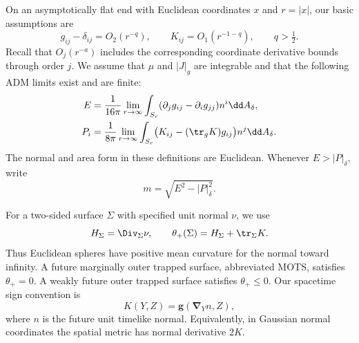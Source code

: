 On an asymptotically flat end with Euclidean coordinates \(x\) and
\(r=|x|\), our basic assumptions are
\begin{equation}\label{n3:intro:decay}
 g_{ij}-\delta_{ij}=O_2(r^{-q}),\qquad
 K_{ij}=O_1(r^{-1-q}),\qquad q>\tfrac12.
\end{equation}
Recall that \(O_j(r^{-a})\) includes the corresponding coordinate
derivative bounds through order \(j\). We assume that \(\mu\) and
\(|J|_g\) are integrable and that the following ADM limits exist and are
finite:
\begin{align}
 E&=\frac1{16\pi}\lim_{r\to\infty}
   \int_{S_r}(\partial_jg_{ij}-\partial_i g_{jj})n^i
                    \dd A_\delta,\label{n3:intro:energy}\\
 P_i&=\frac1{8\pi}\lim_{r\to\infty}
   \int_{S_r}\bigl(K_{ij}-(\tr_gK)g_{ij}\bigr)n^j
                    \dd A_\delta.\label{n3:intro:momentum}
\end{align}
The normal and area form in these definitions are Euclidean. Whenever
\(E>|P|_\delta\), write
\begin{equation}\label{n3:intro:rest-mass}
                         m=\sqrt{E^2-|P|_\delta^2}.
\end{equation}

For a two-sided surface \(\Sigma\) with specified unit normal \(\nu\),
we use
\[
 H_\Sigma=\Div_\Sigma\nu,\qquad
 \theta_+(\Sigma)=H_\Sigma+\tr_\Sigma K.
\]
Thus Euclidean spheres have positive mean curvature for the normal
toward infinity. A future marginally outer trapped surface, abbreviated
MOTS, satisfies \(\theta_+=0\). A weakly future outer trapped surface
satisfies \(\theta_+\le0\). Our spacetime sign convention is
\begin{equation}\label{n3:intro:k-sign}
 K(Y,Z)=\mathbf g(\mathbf\nabla_Y n,Z),
\end{equation}
where \(n\) is the future unit timelike normal. Equivalently, in Gaussian
normal coordinates the spatial metric has normal derivative \(2K\).

